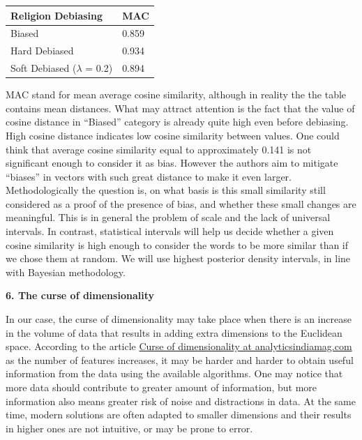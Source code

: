 \documentclass[
  12pt,
]{book}
\begin{document}
\begin{longtable}[]{@{}ll@{}}
\toprule
Religion Debiasing & MAC \\
\midrule
\endhead
Biased & 0.859 \\
Hard Debiased & 0.934 \\
Soft Debiased (\(\lambda\) = 0.2) & 0.894 \\
\bottomrule
\end{longtable}

MAC stand for mean average cosine similarity, although in reality the the table contains mean distances. What may attract attention is the fact that the value of cosine distance in ``Biased'' category is already quite high even before debiasing. High cosine distance indicates low cosine similarity between values. One could think that average cosine similarity equal to approximately 0.141 is not significant enough to consider it as bias. However the authors aim to mitigate ``biases'' in vectors with such great distance to make it even larger. Methodologically the question is, on what basis is this small similarity still considered as a proof of the presence of bias, and whether these small changes are meaningful. This is in general the problem of scale and the lack of universal intervals. In contrast, statistical intervals will help us decide whether a given cosine similarity is high enough to consider the words to be more similar than if we chose them at random. We will use highest posterior density intervals, in line with Bayesian methodology.

\textbf{6. The curse of dimensionality}

In our case, the curse of dimensionality may take place when there is an increase in the volume of data that results in adding extra dimensions to the Euclidean space. According to the article
\href{https://analyticsindiamag.com/curse-of-dimensionality-and-what-beginners-should-do-to-overcome-it/}{Curse of dimensionality at analyticsindiamag.com} as the number of features increases, it may be harder and harder to obtain useful information from the data using the available algorithms. One may notice that more data should contribute to greater amount of information, but more information also means greater risk of noise and distractions in data. At the same time, modern solutions are often adapted to smaller dimensions and their results in higher ones are not intuitive, or may be prone to error.
\end{document}
